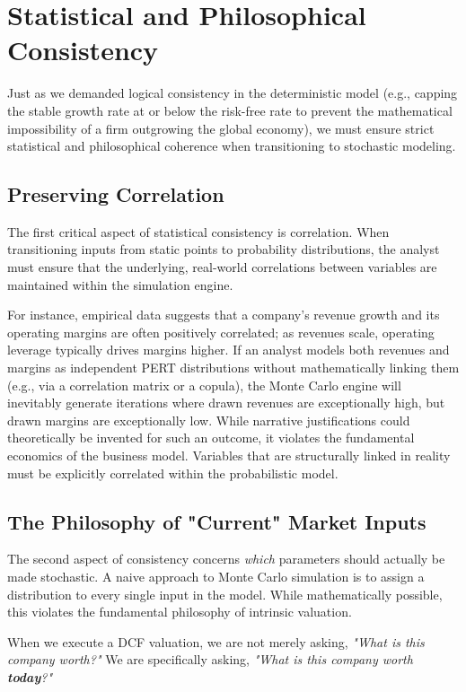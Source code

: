 \section*{Statistical and Philosophical Consistency}

Just as we demanded logical consistency in the deterministic model (e.g., capping the stable growth rate at or below the risk-free rate to prevent the mathematical impossibility of a firm outgrowing the global economy), we must ensure strict statistical and philosophical coherence when transitioning to stochastic modeling.

\subsection*{Preserving Correlation}
The first critical aspect of statistical consistency is correlation. When transitioning inputs from static points to probability distributions, the analyst must ensure that the underlying, real-world correlations between variables are maintained within the simulation engine.

For instance, empirical data suggests that a company's revenue growth and its operating margins are often positively correlated; as revenues scale, operating leverage typically drives margins higher. If an analyst models both revenues and margins as independent PERT distributions without mathematically linking them (e.g., via a correlation matrix or a copula), the Monte Carlo engine will inevitably generate iterations where drawn revenues are exceptionally high, but drawn margins are exceptionally low. While narrative justifications could theoretically be invented for such an outcome, it violates the fundamental economics of the business model. Variables that are structurally linked in reality must be explicitly correlated within the probabilistic model.

\subsection*{The Philosophy of "Current" Market Inputs}
The second aspect of consistency concerns \textit{which} parameters should actually be made stochastic. A naive approach to Monte Carlo simulation is to assign a distribution to every single input in the model. While mathematically possible, this violates the fundamental philosophy of intrinsic valuation.

When we execute a DCF valuation, we are not merely asking, \textit{"What is this company worth?"} We are specifically asking, \textit{"What is this company worth \textbf{today}?"}

